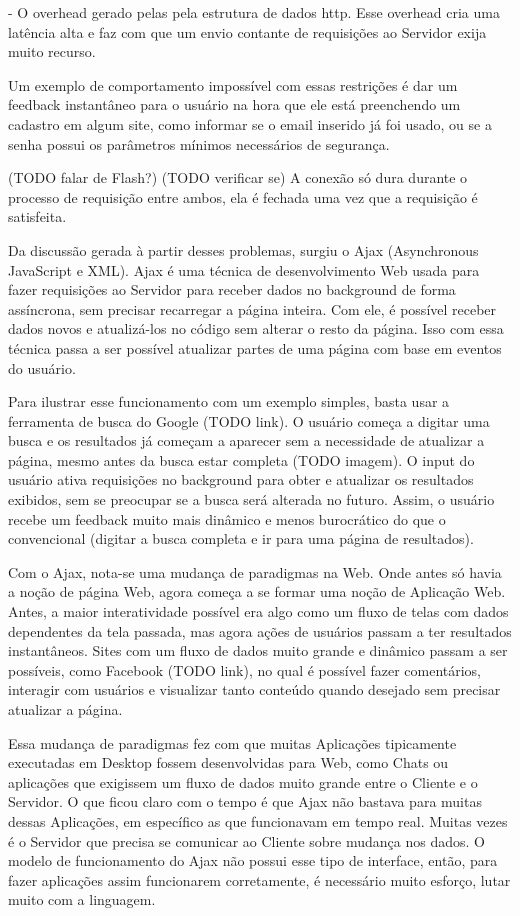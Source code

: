 \documentclass[a4paper,12pt]{article}
\begin{document}
- O overhead gerado pelas pela estrutura de dados http. Esse overhead cria uma latência alta e faz com que um envio contante de requisições ao Servidor exija muito recurso.

Um exemplo de comportamento impossível com essas restrições é dar um feedback instantâneo para o usuário na hora que ele está preenchendo um cadastro em algum site, como informar se o email inserido já foi usado, ou se a senha possui os parâmetros mínimos necessários de segurança.

(TODO falar de Flash?)
(TODO verificar se) A conexão só dura durante o processo de requisição entre ambos, ela é fechada uma vez que a requisição é satisfeita.


Da discussão gerada à partir desses problemas, surgiu o Ajax (Asynchronous JavaScript e XML). Ajax é uma técnica de desenvolvimento Web usada para fazer requisições ao Servidor para receber dados no background de forma assíncrona, sem precisar recarregar a página inteira. Com ele, é possível receber dados novos e atualizá-los no código sem alterar o resto da página. Isso com essa técnica passa a ser possível atualizar partes de uma página com base em eventos do usuário.

Para ilustrar esse funcionamento com um exemplo simples, basta usar a ferramenta de busca do Google (TODO link). O usuário começa a digitar uma busca e os resultados já começam a aparecer sem a necessidade de atualizar a página, mesmo antes da busca estar completa (TODO imagem). O input do usuário ativa requisições no background para obter e atualizar os resultados exibidos, sem se preocupar se a busca será alterada no futuro. Assim, o usuário recebe um feedback muito mais dinâmico e menos burocrático do que o convencional (digitar a busca completa e ir para uma página de resultados).

Com o Ajax, nota-se uma mudança de paradigmas na Web. Onde antes só havia a noção de página Web, agora começa a se formar uma noção de Aplicação Web. Antes, a maior interatividade possível era algo como um fluxo de telas com dados dependentes da tela passada, mas agora ações de usuários passam a ter resultados instantâneos. Sites com um fluxo de dados muito grande e dinâmico passam a ser possíveis, como Facebook (TODO link), no qual é possível fazer comentários, interagir com usuários e visualizar tanto conteúdo quando desejado sem precisar atualizar a página.

Essa mudança de paradigmas fez com que muitas Aplicações tipicamente executadas em Desktop fossem desenvolvidas para Web, como Chats ou aplicações que exigissem um fluxo de dados muito grande entre o Cliente e o Servidor. O que ficou claro com o tempo é que Ajax não bastava para muitas dessas Aplicações, em específico as que funcionavam em tempo real. Muitas vezes é o Servidor que precisa se comunicar ao Cliente sobre mudança nos dados. O modelo de funcionamento do Ajax não possui esse tipo de interface, então, para fazer aplicações assim funcionarem corretamente, é necessário muito esforço, lutar muito com a linguagem.
\end{document}
